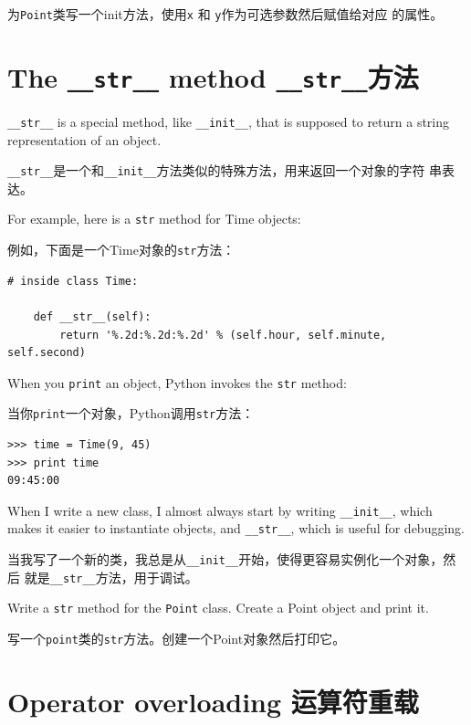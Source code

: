 \documentclass[10pt]{book}
\begin{document}
\begin{CJK}{UTF8}{gbsn}
\begin{exercise}
为{\tt Point}类写一个init方法，使用{\tt x} 和 {\tt y}作为可选参数然后赋值给对应
的属性。

\end{exercise}


\section{The {\tt \_\_str\_\_} method {\tt \_\_str\_\_}方法}

\verb"__str__" is a special method, like \verb"__init__",
that is supposed to return a string representation of an object.

\verb"__str__"是一个和\verb"__init__"方法类似的特殊方法，用来返回一个对象的字符
串表达。

For example, here is a {\tt str} method for Time objects:

例如，下面是一个Time对象的{\tt str}方法：

\begin{verbatim}
# inside class Time:

    def __str__(self):
        return '%.2d:%.2d:%.2d' % (self.hour, self.minute, self.second)
\end{verbatim}
%
When you {\tt print} an object, Python invokes the {\tt str} method:

当你{\tt print}一个对象，Python调用{\tt str}方法：

\begin{verbatim}
>>> time = Time(9, 45)
>>> print time
09:45:00
\end{verbatim}
%
When I write a new class, I almost always start by writing 
\verb"__init__", which makes it easier to instantiate objects, and 
\verb"__str__", which is useful for debugging.

当我写了一个新的类，我总是从\verb"__init__"开始，使得更容易实例化一个对象，然后
就是\verb"__str__"方法，用于调试。


\begin{exercise}

Write a {\tt str} method for the {\tt Point} class.  Create
a Point object and print it.

写一个{\tt point}类的{\tt str}方法。创建一个Point对象然后打印它。

\end{exercise}


\section{Operator overloading 运算符重载}
\label{operator.overloading}


\end{CJK}
\end{document}
